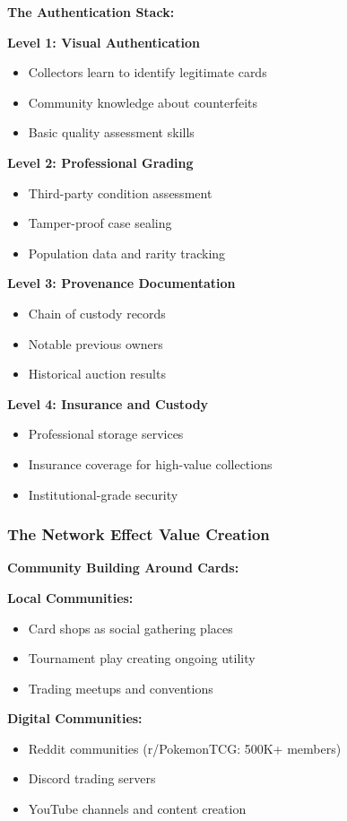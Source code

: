 \documentclass[11pt,oneside]{book}
\begin{document}
\textbf{The Authentication Stack:}

\textbf{Level 1: Visual Authentication}
\begin{itemize}
\item Collectors learn to identify legitimate cards
\item Community knowledge about counterfeits
\item Basic quality assessment skills
\end{itemize}

\textbf{Level 2: Professional Grading}
\begin{itemize}
\item Third-party condition assessment
\item Tamper-proof case sealing
\item Population data and rarity tracking
\end{itemize}

\textbf{Level 3: Provenance Documentation}
\begin{itemize}
\item Chain of custody records
\item Notable previous owners
\item Historical auction results
\end{itemize}

\textbf{Level 4: Insurance and Custody}
\begin{itemize}
\item Professional storage services
\item Insurance coverage for high-value collections
\item Institutional-grade security
\end{itemize}

\subsubsection{The Network Effect Value Creation}

\textbf{Community Building Around Cards:}

\textbf{Local Communities:}
\begin{itemize}
\item Card shops as social gathering places
\item Tournament play creating ongoing utility
\item Trading meetups and conventions
\end{itemize}

\textbf{Digital Communities:}
\begin{itemize}
\item Reddit communities (r/PokemonTCG: 500K+ members)
\item Discord trading servers
\item YouTube channels and content creation
\end{itemize}
\end{document}
